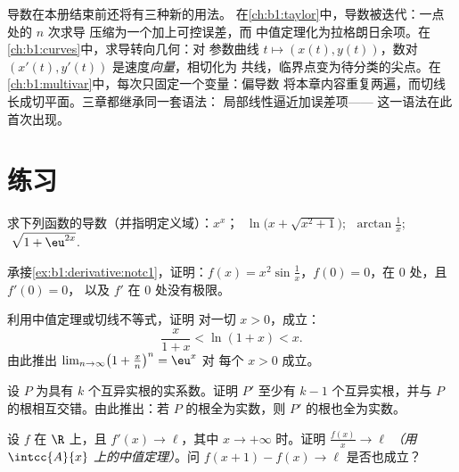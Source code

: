 \begin{remark}[本册内的展望]
导数在本册结束前还将有三种新的用法。
在\cref{ch:b1:taylor}中，导数被迭代：一点处的 $n$ 次求导
压缩为一个加上可控误差，而
中值定理化为拉格朗日余项。在
\cref{ch:b1:curves}中，求导转向几何：对
参数曲线 $t \mapsto (x(t), y(t))$，数对 $(x'(t),
y'(t))$ 是速度\emph{向量}，相切化为
共线，临界点变为待分类的尖点。在
\cref{ch:b1:multivar}中，每次只固定一个变量：偏导数
将本章内容重复两遍，而切线
长成切平面。三章都继承同一套语法：
局部线性逼近加误差项——
这一语法在此首次出现。
\end{remark}

\section{练习}

\begin{exercise}[$\star$]\label{exo:b1:derivative:1}
求下列函数的导数（并指明定义域）：$x^x$；
$\;\ln\bigl(x + \sqrt{x^2+1}\bigr)$; $\;\arctan\frac{1}{x}$;
$\;\sqrt{1 + \eu^{2x}}$.
\end{exercise}

\begin{exercise}[$\star$]\label{exo:b1:derivative:2}
承接\cref{ex:b1:derivative:notc1}，证明：$f(x) = x^2
\sin\frac1x$，$f(0) = 0$，在 $0$ 处，且 $f'(0) = 0$，
以及 $f'$ 在 $0$ 处没有极限。
\end{exercise}

\begin{exercise}[$\star$]\label{exo:b1:derivative:3}
利用中值定理或切线不等式，证明
对一切 $x > 0$，成立：
\[
\frac{x}{1 + x} < \ln(1 + x) < x .
\]
由此推出 $\lim_{n\to\infty} \bigl(1 + \frac xn\bigr)^n = \eu^x$ 对
每个 $x > 0$ 成立。
\end{exercise}

\begin{exercise}[$\star$]\label{exo:b1:derivative:4}
设 $P$ 为具有 $k$ 个互异实根的实系数。证明
$P'$ 至少有 $k - 1$ 个互异实根，并与
$P$ 的根相互交错。由此推出：若 $P$ 的根全为实数，则 $P'$ 的根也全为实数。
\end{exercise}

\begin{exercise}[$\star\star$]\label{exo:b1:derivative:5}
设 $f$ 在 $\R$ 上，且 $f' (x)\to \ell$，其中 $x \to
+\infty$ 时。证明 $\frac{f(x)}{x} \to \ell$ \emph{（用
$\intcc{A}{x}$ 上的中值定理）}。问 $f(x+1) - f(x) \to \ell$ 是否也成立？
\end{exercise}

